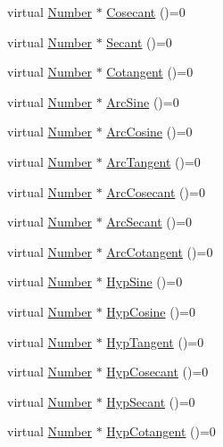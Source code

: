 \begin{DoxyCompactItemize}
\item 
virtual \hyperlink{structNumber}{Number} $\ast$ \hyperlink{structNumber_a267a79888fd185d689e2877b449128d8}{Cosecant} ()=0
\item 
virtual \hyperlink{structNumber}{Number} $\ast$ \hyperlink{structNumber_a63ddfeb7b264f76845a0414dc8ade3e6}{Secant} ()=0
\item 
virtual \hyperlink{structNumber}{Number} $\ast$ \hyperlink{structNumber_a651d9569abac017baaac7b2edb8f09a8}{Cotangent} ()=0
\item 
virtual \hyperlink{structNumber}{Number} $\ast$ \hyperlink{structNumber_aabfd7afb2309911d8f1bc26b6927e4ef}{Arc\+Sine} ()=0
\item 
virtual \hyperlink{structNumber}{Number} $\ast$ \hyperlink{structNumber_a0056c25bf82bef6565963740ebab7517}{Arc\+Cosine} ()=0
\item 
virtual \hyperlink{structNumber}{Number} $\ast$ \hyperlink{structNumber_aaf001a24205a4062b2cfc79873d2884d}{Arc\+Tangent} ()=0
\item 
virtual \hyperlink{structNumber}{Number} $\ast$ \hyperlink{structNumber_a31dc5fa52529b5a7e76459bb984505e8}{Arc\+Cosecant} ()=0
\item 
virtual \hyperlink{structNumber}{Number} $\ast$ \hyperlink{structNumber_aa7056bfff596b8d78757cac21a708094}{Arc\+Secant} ()=0
\item 
virtual \hyperlink{structNumber}{Number} $\ast$ \hyperlink{structNumber_a859439f92698a61407238c4be5c1f1f5}{Arc\+Cotangent} ()=0
\item 
virtual \hyperlink{structNumber}{Number} $\ast$ \hyperlink{structNumber_a5e05df2319f17aa33da95560f9274042}{Hyp\+Sine} ()=0
\item 
virtual \hyperlink{structNumber}{Number} $\ast$ \hyperlink{structNumber_abab40aa368d554af3e94c410aeb6c636}{Hyp\+Cosine} ()=0
\item 
virtual \hyperlink{structNumber}{Number} $\ast$ \hyperlink{structNumber_a0e121d7ed52086bf35a166355101051a}{Hyp\+Tangent} ()=0
\item 
virtual \hyperlink{structNumber}{Number} $\ast$ \hyperlink{structNumber_a0f75e1e5a241d6a639e20d8a6c427541}{Hyp\+Cosecant} ()=0
\item 
virtual \hyperlink{structNumber}{Number} $\ast$ \hyperlink{structNumber_a88a320bdba4f338347207f82f71bd287}{Hyp\+Secant} ()=0
\item 
virtual \hyperlink{structNumber}{Number} $\ast$ \hyperlink{structNumber_a854b3416ab11151bf64247fcfeb69757}{Hyp\+Cotangent} ()=0
\item 

\end{DoxyCompactItemize}
